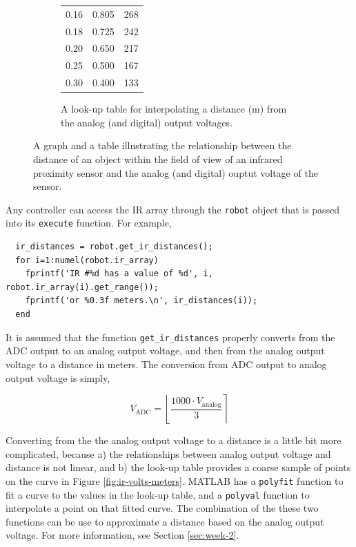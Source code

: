 \documentclass[10pt]{article}
\begin{document}
\begin{figure}[t]
\begin{subfigure}{0.45\textwidth}
\begin{center}
\begin{tabular}{|p{}|p{}|p{}|}
       0.16 & 0.805 & 268 \\
       0.18 & 0.725 & 242 \\
       0.20 & 0.650 & 217 \\
       0.25 & 0.500 & 167 \\
       0.30 & 0.400 & 133 \\
       \hline
    \end{tabular}
  \end{center}
    \caption{A look-up table for interpolating a distance (m) from the analog (and digital) output voltages.}
    \label{fig:ir-adc}
  \end{subfigure}
  \caption{A graph and a table illustrating the relationship between the distance of an object within the field of view of an infrared proximity sensor and the analog (and digital) ouptut voltage of the sensor.}\label{fig:animals}
  \label{fig:quickbot}
\end{figure}

Any controller can access the IR array through the \texttt{robot} object that is passed into its \texttt{execute} function. For example,
\begin{verbatim}
  ir_distances = robot.get_ir_distances();
  for i=1:numel(robot.ir_array)
    fprintf('IR #%d has a value of %d', i, robot.ir_array(i).get_range());
    fprintf('or %0.3f meters.\n', ir_distances(i));
  end
\end{verbatim}

It is assumed that the function \texttt{get\_ir\_distances} properly converts from the ADC output to an analog output voltage, and then from the analog output voltage to a distance in meters. The conversion from ADC output to analog output voltage is simply,

\begin{equation*}
  V_{\text{ADC}} = \left\lfloor\frac{1000\cdot V_{\text{analog}}}{3}\right\rceil
\end{equation*}

Converting from the the analog output voltage to a distance is a little bit more complicated, because a) the relationships between analog output voltage and distance is not linear, and b) the look-up table provides a coarse sample of points on the curve in Figure \ref{fig:ir-volts-meters}. MATLAB has a \texttt{polyfit} function to fit a curve to the values in the look-up table, and a \texttt{polyval} function to interpolate a point on that fitted curve. The combination of the these two functions can be use to approximate a distance based on the analog output voltage. For more information, see Section \ref{sec:week-2}.
\end{document}
